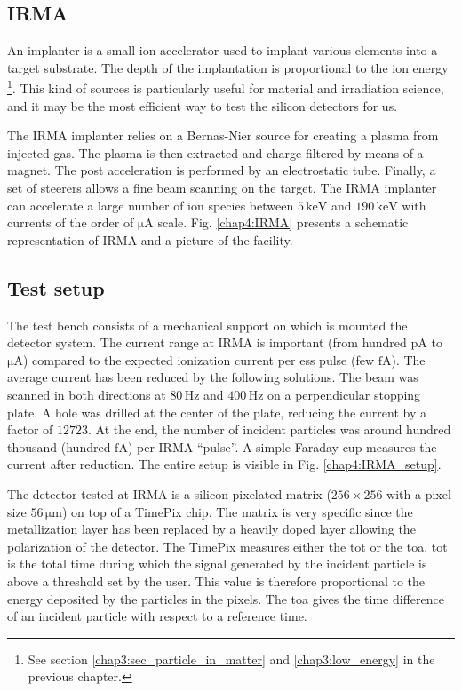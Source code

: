 \begin{refsection}
  \subsection{IRMA}
  An implanter is a small ion accelerator used to implant various elements into a target substrate. The depth of the implantation is proportional to the ion energy \footnote{See section \ref{chap3:sec_particle_in_matter} and \ref{chap3:low_energy} in the previous chapter.}. This kind of sources is particularly useful for material and irradiation science, and it may be the most efficient way to test the silicon detectors for us.

  The IRMA implanter \cite{Chaumont1981} relies on a Bernas-Nier source \cite{Paris1981} for creating a plasma from injected gas. The plasma is then extracted and charge filtered by means of a magnet. The post acceleration is performed by an electrostatic tube. Finally, a set of steerers allows a fine beam scanning on the target. The IRMA implanter can accelerate a large number of ion species between $5 \,\mathrm{keV}$ and $190 \,\mathrm{keV}$ with currents of the order of $\mathrm{\mu A}$ scale. Fig. \ref{chap4:IRMA} presents a schematic representation of IRMA and a picture of the facility. 
  

  \subsection{Test setup}
  The test bench consists of a mechanical support on which is mounted the detector system. The current range at IRMA is important (from hundred $\mathrm{pA}$ to $\mathrm{\mu A}$) compared to the expected ionization current per \acrshort{ess} pulse (few $\mathrm{fA}$). The average current has been reduced by the following solutions. The beam was scanned in both directions at $80 \,\mathrm{Hz}$ and $400\,\mathrm{Hz}$ on a perpendicular stopping plate. A hole was drilled at the center of the plate, reducing the current by a factor of $12723$. At the end, the number of incident particles was around hundred thousand (hundred $\mathrm{fA}$) per IRMA “pulse”. A simple Faraday cup measures the current after reduction. The entire setup is visible in Fig. \ref{chap4:IRMA_setup}.
  

  The detector tested at IRMA is a silicon pixelated matrix ($256 \times 256$ with a pixel size $56\,\mathrm{\mu m}$) on top of a TimePix chip. The matrix is very specific since the metallization layer has been replaced by a heavily doped layer allowing the polarization of the detector. The TimePix measures either the \acrfull{tot} or the \acrfull{toa}. \acrshort{tot} is the total time during which the signal generated by the incident particle is above a threshold set by the user. This value is therefore proportional to the energy deposited by the particles in the pixels. The \acrshort{toa} gives the time difference of an incident particle with respect to a reference time.


\end{refsection}
